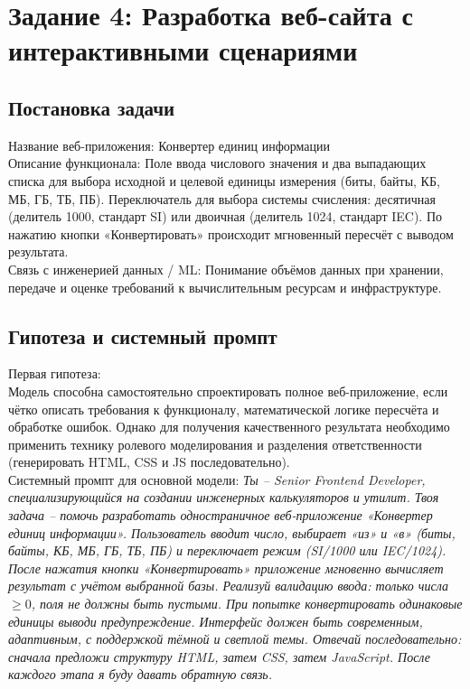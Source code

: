 \newpage
\section*{Задание 4: Разработка веб-сайта с интерактивными сценариями}
\subsection{Постановка задачи}
Название веб-приложения: Конвертер единиц информации \\
Описание функционала: Поле ввода числового значения и два выпадающих списка для выбора исходной и целевой единицы измерения (биты, байты, КБ, МБ, ГБ, ТБ, ПБ). Переключатель для выбора системы счисления: десятичная (делитель 1000, стандарт SI) или двоичная (делитель 1024, стандарт IEC). По нажатию кнопки «Конвертировать» происходит мгновенный пересчёт с выводом результата.\\
Связь с инженерией данных / ML: Понимание объёмов данных при хранении, передаче и оценке требований к вычислительным ресурсам и инфраструктуре.

\subsection{Гипотеза и системный промпт}
Первая гипотеза: \\
Модель способна самостоятельно спроектировать полное веб-приложение, если чётко описать требования к функционалу, математической логике пересчёта и обработке ошибок. Однако для получения качественного результата необходимо применить технику ролевого моделирования и разделения ответственности (генерировать HTML, CSS и JS последовательно).\\

\indent
Системный промпт для основной модели:
\textit{Ты – Senior Frontend Developer, специализирующийся на создании инженерных калькуляторов и утилит. Твоя задача – помочь разработать одностраничное веб-приложение «Конвертер единиц информации». Пользователь вводит число, выбирает «из» и «в» (биты, байты, КБ, МБ, ГБ, ТБ, ПБ) и переключает режим (SI/1000 или IEC/1024). После нажатия кнопки «Конвертировать» приложение мгновенно вычисляет результат с учётом выбранной базы. Реализуй валидацию ввода: только числа $\ge 0$, поля не должны быть пустыми. При попытке конвертировать одинаковые единицы выводи предупреждение. Интерфейс должен быть современным, адаптивным, с поддержкой тёмной и светлой темы. Отвечай последовательно: сначала предложи структуру HTML, затем CSS, затем JavaScript. После каждого этапа я буду давать обратную связь.}\\

